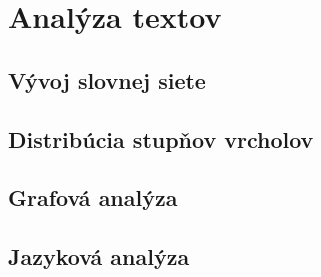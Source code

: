 \chapter{Analýza textov}\label{ch:textAnalysis}

\section{Vývoj slovnej siete}\label{sec:vyvojSlovnejSiete}

\section{Distribúcia stupňov vrcholov}\label{sec:distribuciaStupnovvrcholov}

\section{Grafová analýza}\label{sec:grafovaAnalyza}

\section{Jazyková analýza}\label{sec:jazykovaAnalyza}